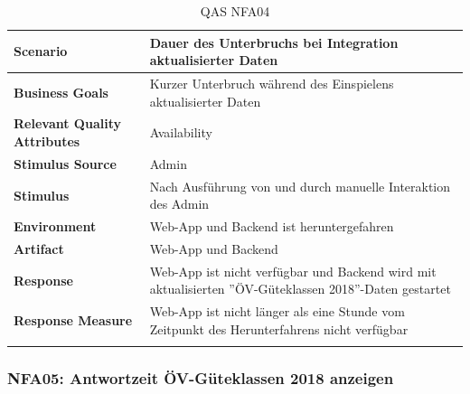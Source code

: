 \begin{longtable}{l p{10.6cm}}
        \toprule
        \textbf{Scenario}
                                & Dauer des Unterbruchs bei Integration aktualisierter Daten\\
        \midrule
        \textbf{Business Goals}
                                & Kurzer Unterbruch während des Einspielens aktualisierter Daten\\
        \textbf{Relevant Quality Attributes}
                                & Availability \\
        \textbf{Stimulus Source}
                                & Admin\\
        \textbf{Stimulus}
                                & Nach Ausführung von \nameref{Use Cases:UC01} und \nameref{Use Cases:UC05} durch manuelle Interaktion des Admin\\
        \textbf{Environment}
                                & Web-App und Backend ist heruntergefahren\\
        \textbf{Artifact}
                                & Web-App und Backend\\
        \textbf{Response}
                                & Web-App ist nicht verfügbar und Backend wird mit aktualisierten ''ÖV-Güteklassen 2018''-Daten gestartet\\  
        \textbf{Response Measure}
                                & Web-App ist nicht länger als eine Stunde vom Zeitpunkt des Herunterfahrens nicht verfügbar\\                                
        \bottomrule
    \caption{QAS NFA04}
    \label{table:nfa04}
\end{longtable}

\subsubsection{NFA05: Antwortzeit ÖV-Güteklassen 2018 anzeigen}
\label{NFA:NFA05}

